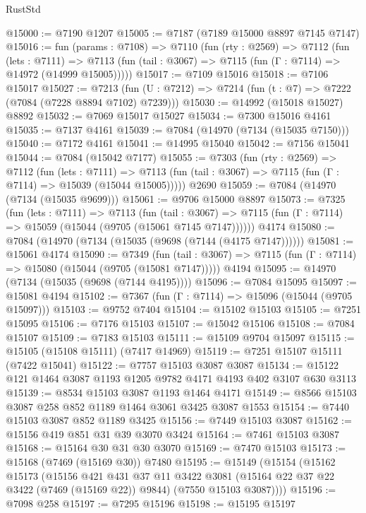 \begin{lexlean}{RustStd}
\begin{coremodule}
@15000 := @7190 @1207
@15005 := @7187 (@7189 @15000 @8897 @7145 @7147)
@15016 := fun (params : @7108) =>
  @7110
    (fun (rty : @2569) =>
    @7112
      (fun (lets : @7111) =>
      @7113 (fun (tail : @3067) => @7115 (fun (Γ : @7114) => @14972 (@14999 @15005)))))
@15017 := @7109 @15016
@15018 := @7106 @15017
@15027 := @7213 (fun (U : @7212) => @7214 (fun (t : @7) => @7222 (@7084 (@7228 @8894 @7102) @7239)))
@15030 := @14992 (@15018 @15027) @8892
@15032 := @7069 @15017 @15027
@15034 := @7300 @15016 @4161
@15035 := @7137 @4161
@15039 := @7084 (@14970 (@7134 (@15035 @7150)))
@15040 := @7172 @4161
@15041 := @14995 @15040
@15042 := @7156 @15041
@15044 := @7084 (@15042 @7177)
@15055 := @7303
    (fun (rty : @2569) =>
    @7112
      (fun (lets : @7111) =>
      @7113 (fun (tail : @3067) => @7115 (fun (Γ : @7114) => @15039 (@15044 @15005)))))
    @2690
@15059 := @7084 (@14970 (@7134 (@15035 @9699)))
@15061 := @9706 @15000 @8897
@15073 := @7325
    (fun (lets : @7111) =>
    @7113
      (fun (tail : @3067) =>
      @7115 (fun (Γ : @7114) => @15059 (@15044 (@9705 (@15061 @7145 @7147))))))
    @4174
@15080 := @7084 (@14970 (@7134 (@15035 (@9698 (@7144 (@4175 @7147))))))
@15081 := @15061 @4174
@15090 := @7349
    (fun (tail : @3067) => @7115 (fun (Γ : @7114) => @15080 (@15044 (@9705 (@15081 @7147)))))
    @4194
@15095 := @14970 (@7134 (@15035 (@9698 (@7144 @4195))))
@15096 := @7084 @15095
@15097 := @15081 @4194
@15102 := @7367 (fun (Γ : @7114) => @15096 (@15044 (@9705 @15097)))
@15103 := @9752 @7404
@15104 := @15102 @15103
@15105 := @7251 @15095
@15106 := @7176 @15103
@15107 := @15042 @15106
@15108 := @7084 @15107
@15109 := @7183 @15103
@15111 := @15109 @9704 @15097
@15115 := @15105 (@15108 @15111) (@7417 @14969)
@15119 := @7251 @15107 @15111 (@7422 @15041)
@15122 := @7757 @15103 @3087 @3087
@15134 := @15122 @121 @1464 @3087 @1193 @1205 @9782 @4171 @4193 @402 @3107 @630 @3113
@15139 := @8534 @15103 @3087 @1193 @1464 @4171
@15149 := @8566 @15103 @3087 @258 @852 @1189 @1464 @3061 @3425 @3087 @1553
@15154 := @7440 @15103 @3087 @852 @1189 @3425
@15156 := @7449 @15103 @3087
@15162 := @15156 @419 @851 @31 @39 @3070 @3424
@15164 := @7461 @15103 @3087
@15168 := @15164 @30 @31 @30 @3070
@15169 := @7470 @15103
@15173 := @15168 (@7469 (@15169 @30)) @7480
@15195 := @15149
    (@15154
      (@15162
        @15173
        (@15156
          @421
          @431
          @37
          @11
          @3422
          @3081
          (@15164 @22 @37 @22 @3422 (@7469 (@15169 @22)) @9844)
          (@7550 @15103 @3087))))
@15196 := @7098 @258
@15197 := @7295 @15196
@15198 := @15195 @15197

\end{coremodule}
\end{lexlean}
